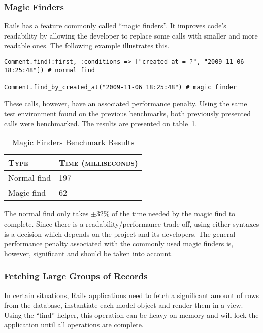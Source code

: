 \subsubsection{Magic Finders}
Rails has a feature commonly called ``magic finders''. It improves code's readability by allowing the developer to replace some calls with smaller and more readable ones. The following example illustrates this.
\begin{lstlisting}[xleftmargin=30pt,xrightmargin=30pt]
Comment.find(:first, :conditions => ["created_at = ?", "2009-11-06 18:25:48"]) # normal find

Comment.find_by_created_at("2009-11-06 18:25:48") # magic finder
\end{lstlisting}
These calls, however, have an associated performance penalty. Using the same test environment found on the previous benchmarks, both previously presented calls were benchmarked. The results are presented on table~\ref{tab:magic_finders}.
\begin{table}[ht]
  \centering
  
  \begin{tabular}{l|l}
    \textsc{Type}
  & \textsc{Time (milliseconds)} \\
  \hline
  Normal find & 197 \\
  Magic find & 62 \\
  
  \end{tabular}
  \caption{Magic Finders Benchmark Results}
  \label{tab:magic_finders}
\end{table}
The normal find only takes $\pm$32\% of the time needed by the magic find to complete. Since there is a readability/performance trade-off, using either syntaxes is a decision which depends on the project and its developers. The general performance penalty associated with the commonly used magic finders is, however, significant and should be taken into account.

\subsubsection{Fetching Large Groups of Records}
In certain situations, Rails applications need to fetch a significant amount of rows from the database, instantiate each model object and render them in a view. Using the ``find'' helper, this operation can be heavy on memory and will lock the application until all operations are complete.

